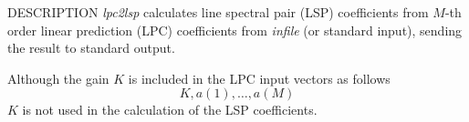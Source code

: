 \begin{synopsis}
\item [lpc2lsp] [ --m $M$ ] [ --s $S$ ] [ --k ] [ --L ] [ --o $O$ ] [ --n $N$ ]
		[ --p $P$ ] [ --q $Q$ ] [ --d $D$ ] 
\item [\ ~~~~~~~~] [ {\em infile} ] 
\end{synopsis}

\begin{qsection}{DESCRIPTION}
{\em lpc2lsp} calculates line spectral pair (LSP) coefficients 
from $M$-th order linear prediction (LPC) coefficients 
from {\em infile} (or standard input),
sending the result to standard output.

Although the gain $K$ is included in the LPC input vectors as follows
\begin{displaymath}
  K, a(1), \dots, a(M)
\end{displaymath}
$K$ is not used in the calculation of the LSP coefficients.


\end{qsection}

